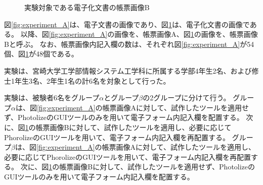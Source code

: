 \begin{figure}[tp]
    \begin{center}
        \caption{実験対象である電子化文書の帳票画像B}
        \label{fig:experiment_B}
    \end{center}
\end{figure}
図\ref{fig:experiment_A}は、電子文書の画像であり、図\ref{fig:experiment_B}は、電子化文書の画像である。
以降、図\ref{fig:experiment_A}の画像を、帳票画像A、図\ref{fig:experiment_B}の画像を、帳票画像Bと呼ぶ。
なお、帳票画像内記入欄の数は、それぞれ図\ref{fig:experiment_A}が54個、図\ref{fig:experiment_B}が48個である。

実験は、宮崎大学工学部情報システム工学科に所属する学部4年生2名、および修士1年生3名、2年生1名の計6名を対象として行った。

実験は、被験者6名をグループ$\alpha$とグループ$\beta$の2グループに分けて行う。
グループ$\alpha$は、図\ref{fig:experiment_A}の帳票画像Aに対して、試作したツールを適用せず、PhotolizeのGUIツールのみを用いて電子フォーム内記入欄を配置する。
次に、図\ref{fig:experiment_B}の帳票画像Bに対して、試作したツールを適用し、必要に応じてPhorolizeのGUIツールを用いて、電子フォーム内記入欄を再配置する。
グループ$\beta$は、図\ref{fig:experiment_A}の帳票画像Aに対して、試作したツールを適用し、必要に応じてPhorolizeのGUIツールを用いて、電子フォーム内記入欄を再配置する。
次に、図\ref{fig:experiment_B}の帳票画像Bに対して、試作したツールを適用せず、PhotolizeのGUIツールのみを用いて電子フォーム内記入欄を配置する。

